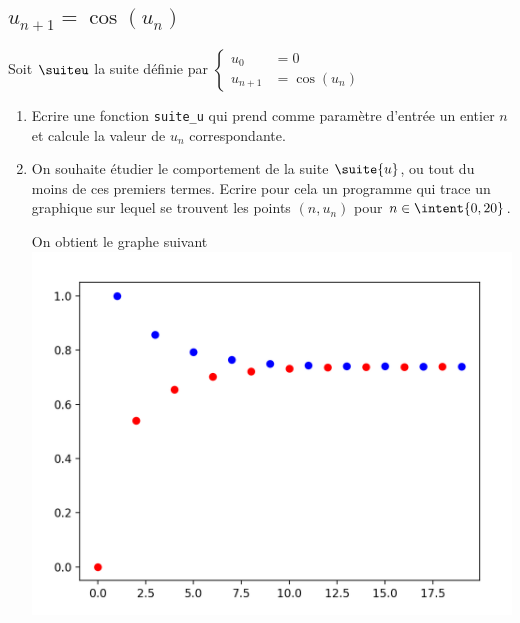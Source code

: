 \subsection{$u_{n+1} = \cos(u_n)$}

\begin{probleme}[Informatique]
Soit $\suiteu$ la suite définie par $\left\{ \begin{array}{ll} 
u_0&=0\\
u_{n+1} &= \cos(u_n)
\end{array}\right.$

\begin{enumerate}
\item Ecrire une fonction \texttt{suite\_u} qui prend comme paramètre d'entrée un entier $n$ et calcule la valeur de $u_n$ correspondante. 
\item On souhaite étudier le comportement de la suite $\suite{u}$, ou tout du moins de ces premiers termes. Ecrire pour cela un programme qui trace un graphique sur lequel se trouvent les points $(n,u_n)$ pour $n\in \intent{0,20}$.

\begin{minipage}[t]{0.4 \textwidth}
On obtient le graphe suivant
\includegraphics[scale=0.3]{suiteu}


\end{minipage}
\end{enumerate}
\end{probleme}
